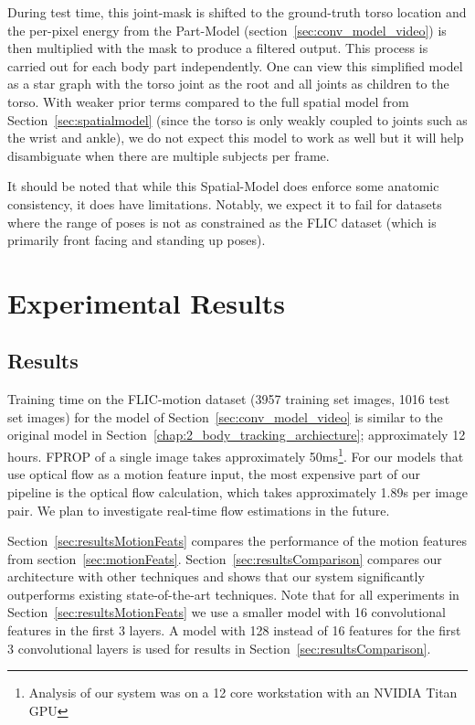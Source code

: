 During test time, this joint-mask is shifted to the ground-truth torso location and the per-pixel energy from the Part-Model (section~\ref{sec:conv_model_video}) is then multiplied with the mask to produce a filtered output.  This process is carried out for each body part independently. One can view this simplified model as a star graph with the torso joint as the root and all joints as children to the torso. With weaker prior terms compared to the full spatial model from Section~\ref{sec:spatialmodel} (since the torso is only weakly coupled to joints such as the wrist and ankle), we do not expect this model to work as well but it will help disambiguate when there are multiple subjects per frame.

It should be noted that while this Spatial-Model does enforce some anatomic consistency, it does have limitations.  Notably, we expect it to fail for datasets where the range of poses is not as constrained as the FLIC dataset (which is primarily front facing and standing up poses).

\chapter{Experimental Results
\label{chap:3_video_body_tracking_experimental}}

\section{Results}

Training time on the FLIC-motion dataset (3957 training set images, 1016 test set images) for the model of Section~\ref{sec:conv_model_video} is similar to the original model in Section~\ref{chap:2_body_tracking_archiecture}; approximately 12 hours. FPROP of a single image takes approximately 50ms\footnote{Analysis of our system was on a 12 core workstation with an NVIDIA Titan GPU}. For our models that use optical flow as a motion feature input,  the most expensive part of our pipeline is the optical flow calculation, which takes approximately 1.89s per image pair. We plan to investigate real-time flow estimations in the future. 

Section~\ref{sec:resultsMotionFeats} compares the performance of the motion features from section~\ref{sec:motionFeats}.  Section~\ref{sec:resultsComparison} compares our architecture with other techniques and shows that our system significantly outperforms existing state-of-the-art techniques. Note that for all experiments in Section~\ref{sec:resultsMotionFeats} we use a smaller model with 16 convolutional features in the first 3 layers. A model with 128 instead of 16 features for the first 3 convolutional layers is used for results in Section~\ref{sec:resultsComparison}. 

